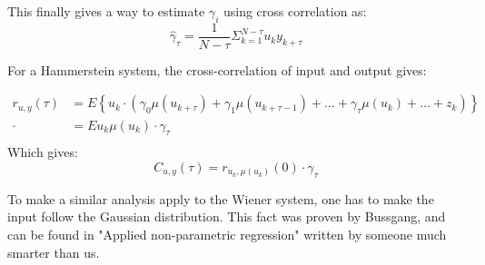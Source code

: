 {This finally gives a way to estimate $\gamma_i$ using cross correlation as:
\begin{equation}
    \hat{\gamma}_\tau = \frac{1}{N-\tau} \Sigma_{k=1}^{N-\tau}u_ky_{k+\tau}
\end{equation}


For a Hammerstein system, the cross-correlation of input and output gives:

\begin{equation}
    \begin{aligned}
        r_{u,y}(\tau)&=E\left\{u_k\cdot\left( \gamma_0\mu(u_{k+\tau}) + \gamma_1\mu(u_{k+\tau-1}) + \dots + \gamma_\tau\mu(u_k) + \dots + z_k  \right)\right\}&\mbox{}\\[1.25ex]
        \cdot&=Eu_k\mu(u_k) \cdot \gamma_\tau &\mbox{}\\[1.25ex]
    \end{aligned}
\end{equation}
Which gives:
\begin{equation}
    C_{u,y}(\tau) = r_{u_k,\mu(u_k)}(0)\cdot \gamma_\tau
\end{equation}

    To make a similar analysis apply to the Wiener system, one has to make the input follow the Gaussian distribution.  This fact was proven by Bussgang, and can be found in "Applied non-parametric regression" written by someone much smarter than us.



}


